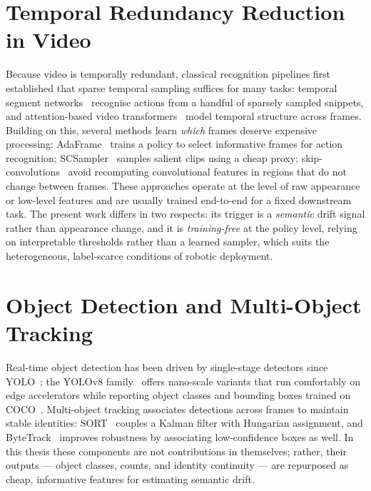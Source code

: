 \section{Temporal Redundancy Reduction in Video}
\label{sec:lit-temporal}

Because video is temporally redundant, classical recognition pipelines first
established that sparse temporal sampling suffices for many tasks: temporal
segment networks~\cite{Wang2016TSN} recognise actions from a handful of
sparsely sampled snippets, and attention-based video
transformers~\cite{Bertasius2021TimeSformer} model temporal structure across
frames. Building on this, several methods learn \emph{which} frames deserve
expensive processing: AdaFrame~\cite{Wu2019AdaFrame} trains a policy to select
informative frames for action recognition; SCSampler~\cite{Korbar2019SCSampler}
samples salient clips using a cheap proxy; skip-convolutions~\cite{Habibian2021Skip}
avoid recomputing convolutional features in regions that do not change between
frames. These approaches operate at the level of raw appearance or low-level
features and are usually trained end-to-end for a fixed downstream task. The
present work differs in two respects: its trigger is a \emph{semantic} drift
signal rather than appearance change, and it is \emph{training-free} at the
policy level, relying on interpretable thresholds rather than a learned
sampler, which suits the heterogeneous, label-scarce conditions of robotic
deployment.

\section{Object Detection and Multi-Object Tracking}
\label{sec:lit-detection}

Real-time object detection has been driven by single-stage detectors since
YOLO~\cite{Redmon2016YOLO}; the YOLOv8 family~\cite{Jocher2023YOLOv8} offers
nano-scale variants that run comfortably on edge accelerators while reporting
object classes and bounding boxes trained on COCO~\cite{Lin2014COCO}.
Multi-object tracking associates detections across frames to maintain stable
identities: SORT~\cite{Bewley2016SORT} couples a Kalman filter with
Hungarian assignment, and ByteTrack~\cite{Zhang2022ByteTrack} improves
robustness by associating low-confidence boxes as well. In this thesis these
components are not contributions in themselves; rather, their outputs ---
object classes, counts, and identity continuity --- are repurposed as cheap,
informative features for estimating semantic drift.

